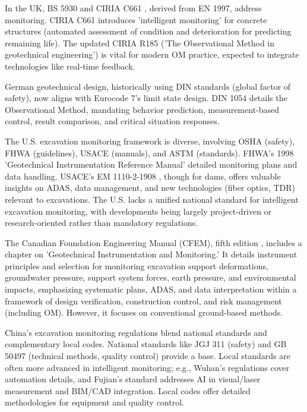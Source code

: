 \documentclass[preprint,11pt,authoryear,3p]{elsarticle}
\begin{document}
In the UK, BS 5930 \citep{BS5930:2015+A1:2020} and CIRIA C661 \citep{CIRIA_C661:2008}, derived from EN 1997, address monitoring. CIRIA C661 introduces 'intelligent monitoring' for concrete structures (automated assessment of condition and deterioration for predicting remaining life). The updated CIRIA R185 ('The Observational Method in geotechnical engineering') \citep{CIRIA_R185:1999} is vital for modern OM practice, expected to integrate technologies like real-time feedback.

German geotechnical design, historically using DIN standards (global factor of safety), now aligns with Eurocode 7's limit state design. DIN 1054 \citep{DIN1054:2021-04} details the Observational Method, mandating behavior prediction, measurement-based control, result comparison, and critical situation responses.

The U.S. excavation monitoring framework is diverse, involving OSHA (safety), FHWA (guidelines), USACE (manuals), and ASTM (standards). FHWA's 1998 'Geotechnical Instrumentation Reference Manual' \citep{Dunnicliff:1998:FHWA} detailed monitoring plans and data handling. USACE's EM 1110-2-1908 \citep{USACE_EM1110-2-1908:2020}, though for dams, offers valuable insights on ADAS, data management, and new technologies (fiber optics, TDR) relevant to excavations. The U.S. lacks a unified national standard for intelligent excavation monitoring, with developments being largely project-driven or research-oriented rather than mandatory regulations.

The Canadian Foundation Engineering Manual (CFEM), fifth edition \citep{CFEM:2023}, includes a chapter on 'Geotechnical Instrumentation and Monitoring.' It details instrument principles and selection for monitoring excavation support deformations, groundwater pressure, support system forces, earth pressure, and environmental impacts, emphasizing systematic plans, ADAS, and data interpretation within a framework of design verification, construction control, and risk management (including OM). However, it focuses on conventional ground-based methods.

China's excavation monitoring regulations blend national standards and complementary local codes. National standards like JGJ 311 \citep{JGJ311:2013} (safety) and GB 50497 \citep{GB50497:2019} (technical methods, quality control) provide a base. Local standards are often more advanced in intelligent monitoring; e.g., Wuhan's regulations \citep{DB4201_T738:2025} cover automation details, and Fujian's standard \citep{DBJ_T13-416:2024} addresses AI in visual/laser measurement and BIM/CAD integration. Local codes offer detailed methodologies for equipment and quality control.
\end{document}
